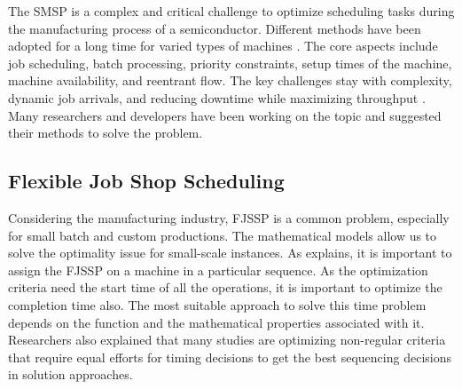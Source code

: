 The SMSP is a complex and critical challenge to optimize scheduling tasks during the manufacturing process of a semiconductor. Different methods have been adopted for a long time for varied types of machines \cite{chan2024situation}. The core aspects include job scheduling, batch processing, priority constraints, setup times of the machine, machine availability, and reentrant flow. The key challenges stay with complexity, dynamic job arrivals, and reducing downtime while maximizing throughput \cite{el2023}. Many researchers and developers have been working on the topic and suggested their methods to solve the problem.




\subsection{Flexible Job Shop Scheduling}
Considering the manufacturing industry, FJSSP is a common problem, especially for small batch and custom productions. The mathematical models allow us to solve the optimality issue for small-scale instances. As \cite{dauzere2024flexible} explains, it is important to assign the FJSSP on a machine in a particular sequence. As the optimization criteria need the start time of all the operations, it is important to optimize the completion time also. The most suitable approach to solve this time problem depends on the function and the mathematical properties associated with it. Researchers also explained that many studies are optimizing non-regular criteria that require equal efforts for timing decisions to get the best sequencing decisions in solution approaches. 

